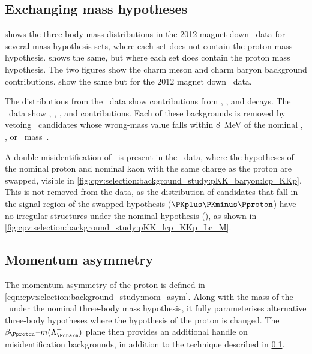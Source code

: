 \subsection{Exchanging mass hypotheses}
\label{chap:cpv:selection:background_study:mass_hypo}

 shows the three-body mass 
distributions in the 2012 magnet down \pKK\ data for several mass hypothesis 
sets, where each set does not contain the proton mass hypothesis.
 shows the same, but where 
each set does contain the proton mass hypothesis.
The two figures show the charm meson and charm baryon background contributions.
show the same but for the 2012 magnet down \ppipi\ data.

The distributions from the \pKK\ data show contributions from 
\decay{\PDplus}{\PKplus\PKminus\Ppiplus}, 
\decay{\PDsplus}{\PKplus\PKminus\Ppiplus}, and 
\decay{\PLambdac}{\Pproton\PKminus\Ppiplus} decays.
The \ppipi\ data show \decay{\PDplus}{\PKplus\Ppiminus\Ppiplus}, 
\decay{\PDplus}{\PKplus\PKminus\Ppiplus}, 
\decay{\PDsplus}{\PKplus\Ppiminus\Ppiplus}, and 
\decay{\PDsplus}{\PKplus\PKminus\Ppiplus} contributions.
Each of these backgrounds is removed by vetoing \PLambdac\ candidates whose 
wrong-mass value falls within \SI{8}{\MeV} of the nominal \PDplus, \PDsplus, or 
\PLambdac\ mass~\cite{PDG2014}.

A double misidentification of \pKK\ is present in the \pKK\ data, where the 
hypotheses of the nominal proton and nominal kaon with the same charge as the 
proton are swapped, visible in 
\cref{fig:cpv:selection:background_study:pKK_baryon:lcp_KKp}.
This is not removed from the data, as the distribution of candidates that fall 
in the signal region of the swapped hypothesis ($\PKplus\PKminus\Pproton$) have 
no irregular structures under the nominal hypothesis (\pKK), as shown in 
\cref{fig:cpv:selection:background_study:pKK_lcp_KKp_Lc_M}.

\subsection{Momentum asymmetry}
\label{chap:cpv:selection:background_study:mom_asym}

The momentum asymmetry of the proton is defined in 
\cref{eqn:cpv:selection:background_study:mom_asym}.
Along with the mass of the \PLambdac\ under the nominal three-body mass 
hypothesis, it fully parameterises alternative three-body hypotheses where the 
hypothesis of the proton is changed.
The $\beta_{\Pproton}$--$m(\PLambdac)$ plane then provides an additional handle 
on misidentification backgrounds, in addition to the technique described in 
\cref{chap:cpv:selection:background_study:mass_hypo}.


